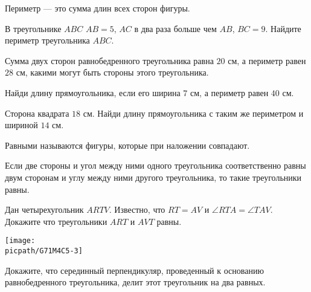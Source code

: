 \begin{class}[number=5]
	\begin{definit}
		Периметр --- это сумма длин всех сторон фигуры.
	\end{definit}
	\begin{listofex}
		\item В треугольнике \(ABC\) \(AB = 5\), \(AC\) в два раза больше чем \( AB \), \(BC = 9\). Найдите периметр треугольника \( ABC \).
		\item Сумма двух сторон равнобедренного треугольника равна \( 20 \) см, а периметр равен \( 28 \) см, какими могут быть стороны этого треугольника.
		\item Найди длину прямоугольника, если его ширина \(7\) см, а периметр равен \(40\) см.
		\item Сторона квадрата \(18\) см. Найди длину прямоугольника с таким же периметром и шириной \(14\) см.
	\end{listofex}
	\begin{definit}
		Равными называются фигуры, которые при наложении совпадают.
	\end{definit}
	\begin{definit}
		Если две стороны и угол между ними одного треугольника соответственно равны двум сторонам и углу между ними другого треугольника, то такие треугольники равны.
	\end{definit}
	\begin{listofex}[resume]
		\item
		\begin{minipage}[t]{\bodywidth}
			Дан четырехугольник \( ARTV \). Известно, что \( RT=AV \) и \( \angle RTA = \angle TAV \). Докажите что треугольники \( ART \) и \( AVT \) равны.
		\end{minipage}
		\hspace{0.03\linewidth}
		\begin{minipage}[c]{\picwidth}
			\texttt{[image: \\picpath/G71M4C5-3]}
		\end{minipage}
		\item Докажите, что серединный перпендикуляр, проведенный к основанию равнобедренного треугольника, делит этот треугольник на два равных.

\end{listofex}
\end{class}
